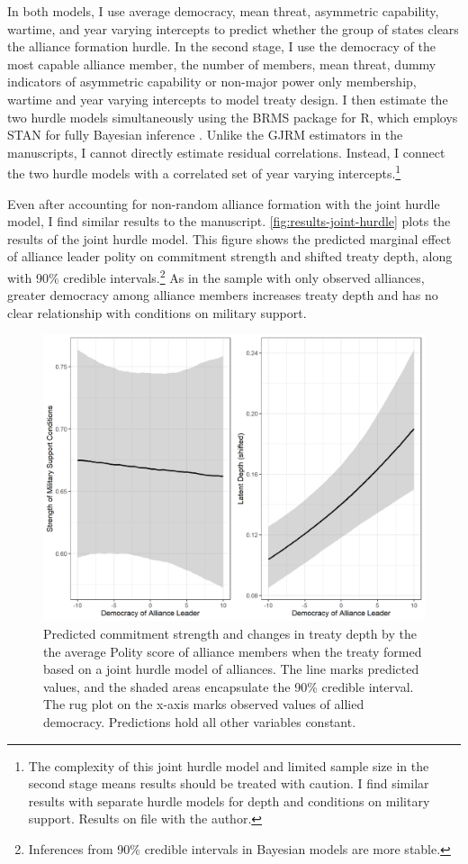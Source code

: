 \documentclass[12pt]{article}
\begin{document}
In both models, I use average democracy, mean threat, asymmetric capability, wartime, and year varying intercepts to predict whether the group of states clears the alliance formation hurdle.
In the second stage, I use the democracy of the most capable alliance member, the number of members, mean threat, dummy indicators of asymmetric capability or non-major power only membership, wartime and year varying intercepts to model treaty design. 
I then estimate the two hurdle models simultaneously using the BRMS package for \textsf{R}, which employs STAN for fully Bayesian inference \citep{Buerkner2017}. 
Unlike the GJRM estimators in the manuscripts, I cannot directly estimate residual correlations.
Instead, I connect the two hurdle models with a correlated set of year varying intercepts.\footnote{The complexity of this joint hurdle model and limited sample size in the second stage means results should be treated with caution. I find similar results with separate hurdle models for depth and conditions on military support. Results on file with the author.} 


Even after accounting for non-random alliance formation with the joint hurdle model, I find similar results to the manuscript. 
\autoref{fig:results-joint-hurdle} plots the results of the joint hurdle model. 
This figure shows the predicted marginal effect of alliance leader polity on commitment strength and shifted treaty depth, along with 90\% credible intervals.\footnote{Inferences from 90\% credible intervals in Bayesian models are more stable.} 
As in the sample with only observed alliances, greater democracy among alliance members increases treaty depth and has no clear relationship with conditions on military support. 


\begin{figure}
\includegraphics[width=.95\textwidth]{results-joint-hurdle.png}  
\caption{Predicted commitment strength and changes in treaty depth by the the average Polity score of alliance members when the treaty formed based on a joint hurdle model of alliances. The line marks predicted values, and the shaded areas encapsulate the 90\% credible interval. The rug plot on the x-axis marks observed values of allied democracy. Predictions hold all other variables constant.}
\label{fig:results-joint-hurdle}
\end{figure}
\end{document}
